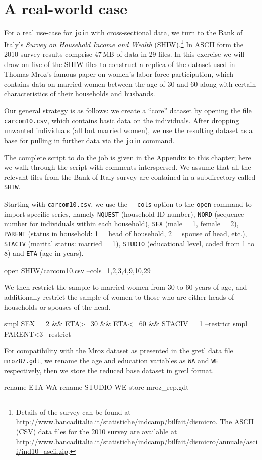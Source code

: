 \section{A real-world case}
\label{sec:join-SHIW}

For a real use-case for \texttt{join} with cross-sectional data, we
turn to the Bank of Italy's \textit{Survey on Household Income and
  Wealth} (SHIW).\footnote{Details of the survey can be found at
  \url{http://www.bancaditalia.it/statistiche/indcamp/bilfait/dismicro}.
  The ASCII (CSV) data files for the 2010 survey are available at
  \url{http://www.bancaditalia.it/statistiche/indcamp/bilfait/dismicro/annuale/ascii/ind10_ascii.zip}.}
In ASCII form the 2010 survey results comprise 47\,MB of data in 29
files. In this exercise we will draw on five of the SHIW files to
construct a replica of the dataset used in Thomas Mroz's famous paper
\citep{mroz87} on women's labor force participation, which contains
data on married women between the age of 30 and 60 along with certain
characteristics of their households and husbands.

Our general strategy is as follows: we create a ``core'' dataset by
opening the file \texttt{carcom10.csv}, which contains basic data on
the individuals. After dropping unwanted individuals (all but married
women), we use the resulting dataset as a base for pulling in further
data via the \texttt{join} command.

The complete script to do the job is given in the Appendix to this
chapter; here we walk through the script with comments interspersed.
We assume that all the relevant files from the Bank of Italy survey
are contained in a subdirectory called \texttt{SHIW}.

Starting with \texttt{carcom10.csv}, we use the \verb|--cols| option
to the \texttt{open} command to import specific series, namely
\texttt{NQUEST} (household ID number), \texttt{NORD} (sequence number
for individuals within each household), \texttt{SEX} (male = 1, female
= 2), \texttt{PARENT} (status in household: 1 = head of household, 2 =
spouse of head, etc.), \texttt{STACIV} (marital status: married = 1),
\texttt{STUDIO} (educational level, coded from 1 to 8) and
\texttt{ETA} (age in years).
%
\begin{code}
open SHIW/carcom10.csv --cols=1,2,3,4,9,10,29
\end{code}
%
We then restrict the sample to married women from 30 to 60 years of
age, and additionally restrict the sample of women to those who are
either heads of households or spouses of the head.
%
\begin{code}
smpl SEX==2 && ETA>=30 && ETA<=60 && STACIV==1 --restrict
smpl PARENT<3  --restrict
\end{code}
%
For compatibility with the Mroz dataset as presented in the gretl
data file \texttt{mroz87.gdt}, we rename the age and education
variables as \texttt{WA} and \texttt{WE} respectively, then we
store the reduced base dataset in gretl format.
%
\begin{code}
rename ETA WA
rename STUDIO WE
store mroz_rep.gdt
\end{code}

